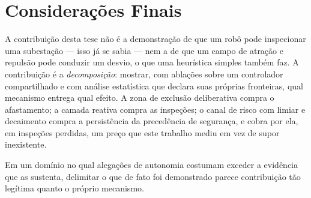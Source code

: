 \section{Considerações Finais}
\label{sec:conc-finais}

A contribuição desta tese não é a demonstração de que um robô pode inspecionar uma
subestação --- isso já se sabia --- nem a de que um campo de atração e repulsão pode
conduzir um desvio, o que uma heurística simples também faz. A contribuição é a
\emph{decomposição}: mostrar, com ablações sobre um controlador compartilhado e com
análise estatística que declara suas próprias fronteiras, qual mecanismo entrega qual
efeito. A zona de exclusão deliberativa compra o afastamento; a camada reativa compra
as inspeções; o canal de risco com limiar e decaimento compra a persistência da
precedência de segurança, e cobra por ela, em inspeções perdidas, um preço que
este trabalho mediu em vez de supor inexistente.

Em um domínio no qual alegações de autonomia costumam exceder a evidência que as
sustenta, delimitar o que de fato foi demonstrado parece contribuição tão legítima
quanto o próprio mecanismo.
